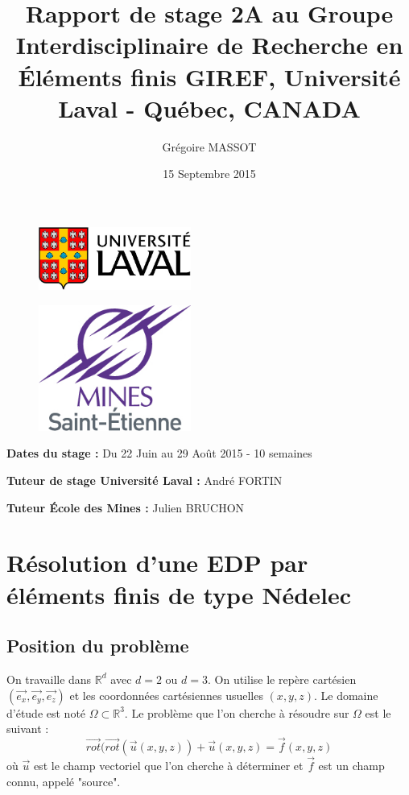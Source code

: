 \documentclass[a4paper,12pt]{article}
\title{Rapport de stage 2A au Groupe Interdisciplinaire de Recherche en Éléments finis GIREF, Université Laval - Québec, CANADA}
\author{Grégoire MASSOT}
\date{15 Septembre 2015}
\begin{document}
\maketitle
\begin {figure}[!ht]
\begin{center}
\includegraphics [width =5cm]{LogoULaval.jpg}
\end{center}
\end{figure}

\begin {figure}[!ht]
\begin{center}
\includegraphics [width =5cm]{LogoEMSE.jpg}
\end{center}
\end{figure}
\newpage
\textbf{Dates du stage : } Du 22 Juin au 29 Août 2015 - 10 semaines

\textbf{Tuteur de stage Université Laval : } André FORTIN

\textbf{Tuteur École des Mines : } Julien BRUCHON
\tableofcontents
\newpage
{}
  
\section{Résolution d'une EDP par éléments finis de type Nédelec}
\subsection{Position du problème}
On travaille dans $\mathbb{R}^d$ avec $d=2$ ou $d=3$. On utilise le repère cartésien $(\vec{e_{x}}, \vec{e_{y}}, \vec{e_{z}})$ 
et les coordonnées cartésiennes usuelles $(x,y,z)$. Le domaine d'étude est noté $\Omega \subset \mathbb{R}^3$. 
Le problème que l'on cherche à résoudre sur $\Omega$ est le suivant :
\[
\vec{rot}(\vec{rot}(\vec{u}(x,y,z)) + \vec{u}(x,y,z) = \vec{f}(x,y,z)
\]
où $\vec{u}$ est le champ vectoriel que l'on cherche à déterminer et $\vec{f}$ est un champ connu, appelé "source".
\end{document}
